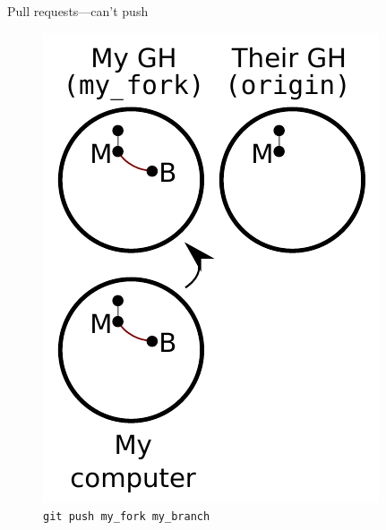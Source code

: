 \begin{frame}{Pull requests---can't push}
  \begin{figure}
    \includegraphics{fork_005.pdf}
    \\ \texttt{git push my\_fork my\_branch}
    \\ \texttt{}
  \end{figure}
\end{frame}

